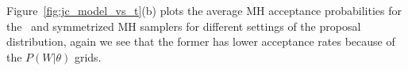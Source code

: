   Figure~\ref{fig:jc_model_vs_t}(b) plots the average MH acceptance probabilities for the \naive\ and symmetrized MH samplers for different settings of the proposal distribution, again we see that the former has lower acceptance rates because of the $P(W|\theta)$ grids.
